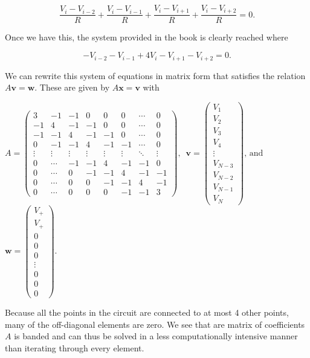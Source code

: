 \documentclass[11pt]{article}
\begin{document}
\[\frac{V_i - V_{i-2}}{R} + \frac{V_i - V_{i-1}}{R} + \frac{V_i - V_{i+1}}{R} + \frac{V_i - V_{i+2}}{R} = 0.\]

Once we have this, the system provided in the book is clearly reached
where

\[-V_{i-2} - V_{i-1} + 4V_i - V_{i+1} - V_{i+2} = 0.\]

We can rewrite this system of equations in matrix form that satisfies
the relation \(A\mathbf{v} = \mathbf{w}.\) These are given by
\(A\mathbf{x} = \mathbf{v}\) with

\(A = \begin{pmatrix}  3 & -1 & -1 & 0 & 0 & 0 & \cdots & 0 \\  -1 & 4 & -1 & -1 & 0 & 0 & \cdots & 0 \\  -1 & -1 & 4 & -1 & -1& 0 & \cdots & 0 \\  0 &-1 & -1 & 4 & -1 & -1& \cdots & 0 \\  \vdots & \vdots & \vdots & \vdots & \vdots &\vdots & \ddots & \vdots \\  0 &\cdots& -1&-1&4&-1&-1&0\\  0&\cdots&0&-1&-1&4&-1&-1 \\  0&\cdots&0&0&-1 & -1 & 4 & -1 \\  0 & \cdots &0&0& 0 & -1 & -1 & 3 \end{pmatrix} \text{, }\)
\(\mathbf{v} = \begin{pmatrix} V_1 \\ V_2 \\ V_3 \\ V_4 \\ \vdots \\ V_{N-3} \\ V_{N-2} \\ V_{N-1} \\ V_N \end{pmatrix} \text{, and }\)
\(\mathbf{w} = \begin{pmatrix} V_+ \\ V_+ \\ 0 \\ 0 \\ 0 \\ \vdots \\ 0 \\ 0 \\ 0 \end{pmatrix}.\)

Because all the points in the circuit are connected to at most 4 other
points, many of the off-diagonal elements are zero. We see that are
matrix of coefficients \(A\) is banded and can thus be solved in a less
computationally intensive manner than iterating through every element.
\end{document}
